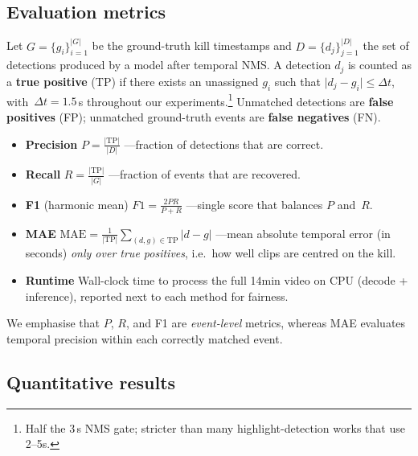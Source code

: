 \documentclass[10pt,twocolumn,letterpaper]{article}
\begin{document}
\subsection{Evaluation metrics}
\label{sec:metrics}

Let $G=\{g_i\}_{i=1}^{|G|}$ be the ground-truth kill timestamps and
$D=\{d_j\}_{j=1}^{|D|}$ the set of detections produced by a model after
temporal NMS.
A detection $d_j$ is counted as a \textbf{true positive} (TP) if there
exists an unassigned $g_i$ such that
$\lvert d_j-g_i\rvert \le \Delta t$,
with~$\Delta t = 1.5$\,s throughout our experiments.\footnote{%
Half the 3\,s NMS gate; stricter than many highlight-detection works
that use 2–5s.}
Unmatched detections are \textbf{false positives} (FP); unmatched
ground-truth events are \textbf{false negatives} (FN).

\begin{itemize}[leftmargin=*,itemsep=2pt]
\item \textbf{Precision}  
      $P = \tfrac{\lvert \mathrm{TP}\rvert}{\lvert D\rvert}$
      ---fraction of detections that are correct.
\item \textbf{Recall}  
      $R = \tfrac{\lvert \mathrm{TP}\rvert}{\lvert G\rvert}$
      ---fraction of events that are recovered.
\item \textbf{F1} (harmonic mean)  
      $F1 = \tfrac{2PR}{P+R}$
      ---single score that balances $P$ and~$R$.
\item \textbf{MAE}  
      $\mathrm{MAE}= \frac1{\lvert \mathrm{TP}\rvert}\sum_{(d,g)\in\mathrm{TP}}
      \lvert d-g\rvert$  
      ---mean absolute temporal error (in seconds) \emph{only over true
      positives}, i.e.\ how well clips are centred on the kill.
\item \textbf{Runtime}  
      Wall-clock time to process the full 14min video on CPU
      (decode + inference), reported next to each method for fairness.
\end{itemize}

We emphasise that $P$, $R$, and F1 are \emph{event-level} metrics,
whereas MAE evaluates temporal precision within each correctly matched
event.


\subsection{Quantitative results}
\end{document}
